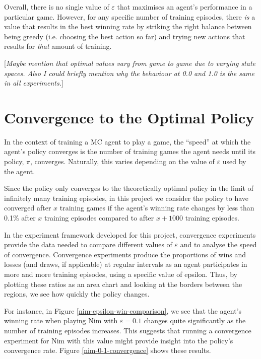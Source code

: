 \documentclass[11pt,a4paper]{report}
\begin{document}
Overall, there is no single value of $\varepsilon$ that maximises an agent's performance in a particular game. However, for any specific number of training episodes, there \emph{is} a value that results in the best winning rate by striking the right balance between being greedy (i.e. choosing the best action so far) and trying new actions that results for \emph{that} amount of training.

[\emph{Maybe mention that optimal values vary from game to game due to varying state spaces. Also I could briefly mention why the behaviour at 0.0 and 1.0 is the same in all experiments.}]


\section{Convergence to the Optimal Policy}

In the context of training a MC agent to play a game, the ``speed'' at which the agent's policy converges is the number of training games the agent needs until its policy, $\pi$, converges. Naturally, this varies depending on the value of $\varepsilon$ used by the agent.

Since the policy only converges to the theoretically optimal policy in the limit of infinitely many training episodes, in this project we consider the policy to have converged after $x$ training games if the agent's winning rate changes by less than 0.1\% after $x$ training episodes compared to after $x+1000$ training episodes.

In the experiment framework developed for this project, convergence experiments provide the data needed to compare different values of $\varepsilon$ and to analyse the speed of convergence. Convergence experiments produce the proportions of wins and losses (and draws, if applicable) at regular intervals as an agent participates in more and more training episodes, using a specific value of epsilon. Thus, by plotting these ratios as an area chart and looking at the borders between the regions, we see how quickly the policy changes.

For instance, in Figure \ref{nim-epsilon-win-comparison}, we see that the agent's winning rate when playing Nim with $\varepsilon = 0.1$ changes quite significantly as the number of training episodes increases. This suggests that running a convergence experiment for Nim with this value might provide insight into the policy's convergence rate. Figure \ref{nim-0-1-convergence} shows these results.
\end{document}
